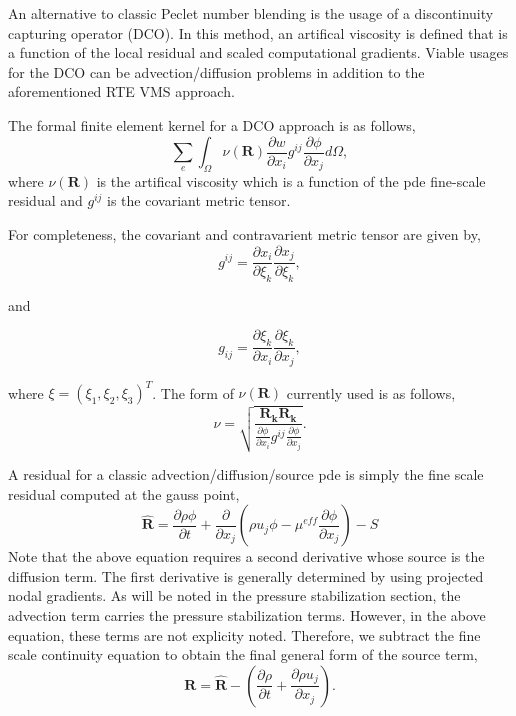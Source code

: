 An alternative to classic Peclet number blending is the usage of a discontinuity capturing operator (DCO).
In this method, an artifical viscosity is defined that is a function of the local residual and scaled computational 
gradients. Viable usages for the DCO can be advection/diffusion problems in addition to the aforementioned RTE
VMS approach.

The formal finite element kernel for a DCO approach is as follows,
\begin{equation}
  \sum_e \int_\Omega \nu(\mathbf{R}) \frac{\partial w}{\partial x_i} g^{ij} \frac{\partial \phi} {\partial x_j} d\Omega,
\label{dcoFEMForm}
\end{equation}
where $\nu(\mathbf{R})$ is the artifical viscosity which is a function of the pde fine-scale residual and $g^{ij}$ is the covariant
metric tensor.

For completeness, the covariant and contravarient metric tensor are given by,
\begin{equation}
  g^{ij} = \frac{\partial x_i} {\partial \xi_k}\frac{\partial x_j} {\partial \xi_k},
\label{coVariant}
\end{equation}

 and

\begin{equation}
  g_{ij} = \frac{\partial \xi_k} {\partial x_i} \frac{\partial \xi_k} {\partial x_j},
\label{coVariant}
\end{equation}

where $\xi = (\xi_1, \xi_2, \xi_3)^T$.
%
The form of $\nu(\mathbf{R})$ currently used is as follows,
\begin{equation}
  \nu = \sqrt{ \frac{\mathbf{R_k} \mathbf{R_k}} {\frac {\partial \phi}{\partial x_i} g^{ij} \frac{\partial \phi}{\partial x_j}} }.
\label{nuOne}
\end{equation}

A residual for a classic advection/diffusion/source pde is simply the fine scale residual computed at the gauss point,
\begin{equation}
 \mathbf{\hat R} = \frac{\partial \rho \phi}{\partial t} + \frac{\partial}{\partial x_j} (\rho u_j \phi - \mu^{eff} \frac{\partial \phi}{\partial x_j}) -S
 \label{dcoResidual}
\end{equation}
Note that the above equation requires a second derivative whose source is the diffusion term. The first derivative is generally determined
by using projected nodal gradients. As will be noted in the pressure stabilization section, the advection term carries the pressure
stabilization terms. However, in the above equation, these terms are not explicity noted. Therefore, we subtract the fine scale continuity
equation to obtain the final general form of the source term,
\begin{equation}
 \mathbf{R} = \mathbf{\hat R} -  (\frac{\partial \rho}{\partial t} + \frac{\partial \rho u_j }{\partial x_j}).
 \label{dcoResidual}
\end{equation}

